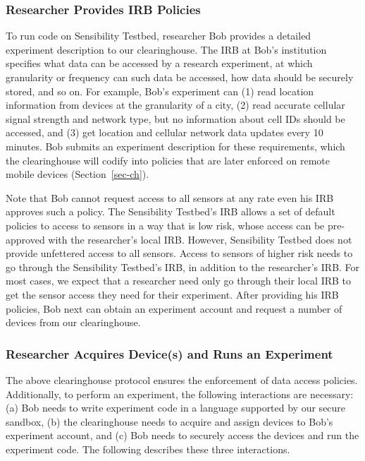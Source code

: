 \subsubsection{Researcher Provides IRB
Policies}\label{sec-irb-policy}

To run code on Sensibility Testbed, researcher Bob provides a
detailed experiment description to our clearinghouse. The IRB at
Bob's institution specifies what data can be accessed by a
research experiment, at which granularity or frequency can such
data be accessed, how data should be securely stored, and so on.
For example, Bob's experiment can (1) read location information
from devices at the granularity of a city, (2) read accurate
cellular signal strength and network type, but no information
about cell IDs should be accessed, and (3) get location and
cellular network data updates every 10 minutes. Bob submits an
experiment description for these requirements, which the
clearinghouse will codify into policies that are later enforced
on remote mobile devices (Section~\ref{sec-ch}).

Note that Bob cannot request access to all sensors at any rate
even his IRB approves such a policy. The Sensibility Testbed's
IRB allows a set of default policies to access to sensors in a
way that is low risk, whose access can be pre-approved with the
researcher's local IRB. However, Sensibility Testbed does not
provide unfettered access to all sensors. Access to sensors of
higher risk needs to go through the Sensibility Testbed's IRB,
in addition to the researcher's IRB. For most cases, we expect
that a researcher need only go through their local IRB to get
the sensor access they need for their experiment. After
providing his IRB policies, Bob next can obtain an experiment
account and request a number of devices from our clearinghouse.

\subsubsection{Researcher Acquires Device(s) and Runs an
Experiment}\label{sec-acquire-run}

The above clearinghouse protocol ensures the enforcement of data
access policies. Additionally, to perform an experiment, the
following interactions are necessary: (a) Bob needs to write
experiment code in a language supported by our secure sandbox,
(b) the clearinghouse needs to acquire and assign devices to
Bob's experiment account, and (c) Bob needs to securely access
the devices and run the experiment code. The following describes
these three interactions.

